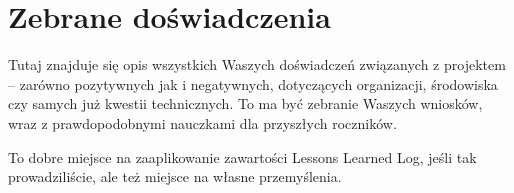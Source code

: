 \chapter{Zebrane doświadczenia}
\label{Chapter8}

Tutaj znajduje się opis wszystkich Waszych doświadczeń związanych z projektem -- zarówno pozytywnych jak i negatywnych, dotyczących organizacji, środowiska czy samych już kwestii technicznych. To ma być zebranie Waszych wniosków, wraz z prawdopodobnymi nauczkami dla przyszłych roczników. 

To dobre miejsce na zaaplikowanie zawartości Lessons Learned Log, jeśli tak prowadziliście, ale też miejsce na własne przemyślenia.